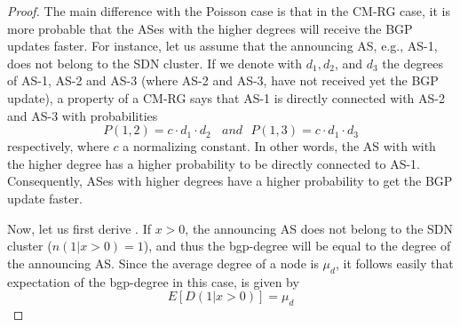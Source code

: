 \begin{proof}
The main difference with the Poisson case is that in the CM-RG case, it is more probable that the ASes with the higher degrees will receive the BGP updates faster. For instance, let us assume that the announcing AS, e.g., AS-1, does not belong to the SDN cluster. If we denote with $d_{1},d_{2}$, and $d_{3}$ the degrees of AS-1, AS-2 and AS-3 (where AS-2 and AS-3, have not received yet the BGP update), a property of a CM-RG says that AS-1 is directly connected with AS-2 and AS-3 with probabilities
\begin{equation}
P(1,2) = c\cdot d_{1}\cdot d_{2}~~~~and~~~P(1,3) = c\cdot d_{1}\cdot d_{3}
\end{equation}
respectively, where $c$ a normalizing constant. In other words, the AS with with the higher degree has a higher probability to be directly connected to AS-1. Consequently, ASes with higher degrees have a higher probability to get the BGP update faster.

Now, let us first derive . If $x>0$, the announcing AS does not belong to the SDN cluster ($n(1|x>0)=1$), and thus the bgp-degree will be equal to the degree of the announcing AS. Since the average degree of a node is $\mu_{d}$, it follows easily that expectation of the bgp-degree in this case, is given by
\begin{equation}
E[D(1|x>0)] = \mu_{d}
\end{equation}


\end{proof}
